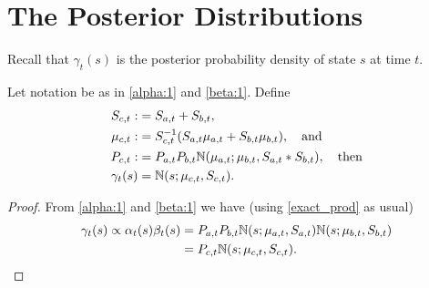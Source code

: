 \documentclass[12pt,leqno]{article}
\begin{document}
\section{The Posterior Distributions}

Recall that $\gamma_t(s)$ is the posterior probability density of state $s$
at time $t$. 
\begin{Thm}
  Let notation be as in \eqref{alpha:1} and \eqref{beta:1}.  Define
\begin{align*}
  S_{c,t} :&= S_{a,t} + S_{b,t}, \\
  \mu_{c,t} :&= S_{c,t}^{-1}(S_{a,t}\mu_{a,t} + S_{b,t}\mu_{b,t}), \quad\text{and}\\
  P_{c,t} :&= P_{a,t}P_{b,t}{\mathbb N}(\mu_{a,t};\mu_{b,t},S_{a,t}*S_{b,t}), \quad\text{then} \\
 \gamma_t(s) &= {\mathbb N}(s;\mu_{c,t},S_{c,t}).
  \end{align*}
\end{Thm}
\begin{proof}
  From \eqref{alpha:1} and \eqref{beta:1} we have (using \eqref{exact_prod}
  as usual)
  \begin{align*}
  \gamma_t(s) \propto \alpha_t(s)\beta_t(s) &= P_{a,t}P_{b,t}{\mathbb N}(s;\mu_{a,t},S_{a,t}){\mathbb N}(s;\mu_{b,t},S_{b,t})\\
  &= P_{c,t}{\mathbb N}(s;\mu_{c,t},S_{c,t}).
  \end{align*}
\end{proof}
\end{document}
